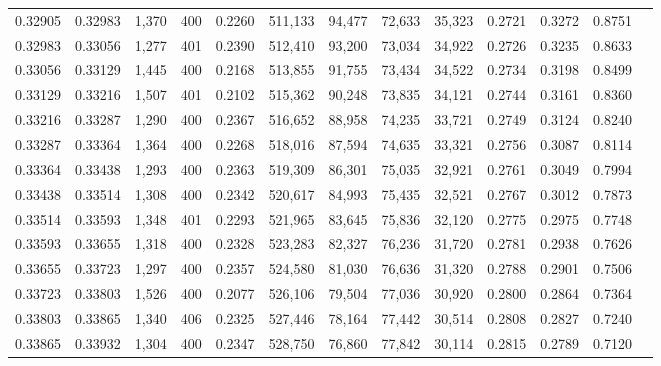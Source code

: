 \begin{tabular}{rrrrrrrrrrrrr}
0.32905 & 0.32983 &  1,370 & 400 &                                     0.2260 & 511,133 &  94,477 &  72,633 &  35,323 & 0.2721 & 0.3272 & 0.8751 \\
0.32983 & 0.33056 &  1,277 & 401 &                                     0.2390 & 512,410 &  93,200 &  73,034 &  34,922 & 0.2726 & 0.3235 & 0.8633 \\
0.33056 & 0.33129 &  1,445 & 400 &                                     0.2168 & 513,855 &  91,755 &  73,434 &  34,522 & 0.2734 & 0.3198 & 0.8499 \\
0.33129 & 0.33216 &  1,507 & 401 &                                     0.2102 & 515,362 &  90,248 &  73,835 &  34,121 & 0.2744 & 0.3161 & 0.8360 \\
0.33216 & 0.33287 &  1,290 & 400 &                                     0.2367 & 516,652 &  88,958 &  74,235 &  33,721 & 0.2749 & 0.3124 & 0.8240 \\
0.33287 & 0.33364 &  1,364 & 400 &                                     0.2268 & 518,016 &  87,594 &  74,635 &  33,321 & 0.2756 & 0.3087 & 0.8114 \\
0.33364 & 0.33438 &  1,293 & 400 &                                     0.2363 & 519,309 &  86,301 &  75,035 &  32,921 & 0.2761 & 0.3049 & 0.7994 \\
0.33438 & 0.33514 &  1,308 & 400 &                                     0.2342 & 520,617 &  84,993 &  75,435 &  32,521 & 0.2767 & 0.3012 & 0.7873 \\
0.33514 & 0.33593 &  1,348 & 401 &                                     0.2293 & 521,965 &  83,645 &  75,836 &  32,120 & 0.2775 & 0.2975 & 0.7748 \\
0.33593 & 0.33655 &  1,318 & 400 &                                     0.2328 & 523,283 &  82,327 &  76,236 &  31,720 & 0.2781 & 0.2938 & 0.7626 \\
0.33655 & 0.33723 &  1,297 & 400 &                                     0.2357 & 524,580 &  81,030 &  76,636 &  31,320 & 0.2788 & 0.2901 & 0.7506 \\
0.33723 & 0.33803 &  1,526 & 400 &                                     0.2077 & 526,106 &  79,504 &  77,036 &  30,920 & 0.2800 & 0.2864 & 0.7364 \\
0.33803 & 0.33865 &  1,340 & 406 &                                     0.2325 & 527,446 &  78,164 &  77,442 &  30,514 & 0.2808 & 0.2827 & 0.7240 \\
0.33865 & 0.33932 &  1,304 & 400 &                                     0.2347 & 528,750 &  76,860 &  77,842 &  30,114 & 0.2815 & 0.2789 & 0.7120 \\

\end{tabular}
